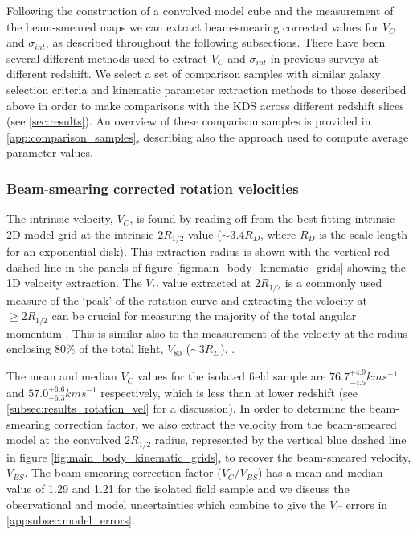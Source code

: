 \documentclass[fleqn,usenatbib]{mn2e}
\begin{document}
Following the construction of a convolved model cube and the measurement of the beam-smeared maps we can extract beam-smearing corrected values for $V_{C}$ and $\sigma_{int}$, as described throughout the following subsections.
There have been several different methods used to extract $V_{C}$ and $\sigma_{int}$ in previous surveys at different redshift.
We select a set of comparison samples with similar galaxy selection criteria and kinematic parameter extraction methods to those described above in order to make comparisons with the KDS across different redshift slices (see \cref{sec:results}).
An overview of these comparison samples is provided in \cref{app:comparison_samples}, describing also the approach used to compute average parameter values.

\subsubsection{Beam-smearing corrected rotation velocities}\label{subsubsec:beam_smearing_corrected_velocities}
The intrinsic velocity, $V_{C}$, is found by reading off from the best fitting intrinsic 2D model grid at the intrinsic $2R_{1/2}$ value ($\sim3.4R_{D}$, where $R_{D}$ is the scale length for an exponential disk).
This extraction radius is shown with the vertical red dashed line in the panels of figure \ref{fig:main_body_kinematic_grids} showing the 1D velocity extraction.
The $V_{C}$ value extracted at $2R_{1/2}$ is a commonly used measure of the `peak' of the rotation curve \citep[e.g.][]{Miller2011,Pelliccia2016,Stott2016,Harrison2017} and extracting the velocity at $\geqslant 2R_{1/2}$ can be crucial for measuring the majority of the total angular momentum \citep[e.g.][]{Obreschkow2015,Harrison2017,Swinbank2017}.
This is similar also to the measurement of the velocity at the radius enclosing 80$\%$ of the total light, $V_{80}$ ($\sim3R_{D}$), \citep{Tiley2016a}.

The mean and median $V_{C}$ values for the isolated field sample are $76.7^{+4.9}_{-4.5}kms^{-1}$ and $57.0^{+6.6}_{-6.3}kms^{-1}$ respectively, which is less than at lower redshift (see \cref{subsec:results_rotation_vel} for a discussion).
In order to determine the beam-smearing correction factor, we also extract the velocity from the beam-smeared model at the convolved $2R_{1/2}$ radius, represented by the vertical blue dashed line in figure \ref{fig:main_body_kinematic_grids}, to recover the beam-smeared velocity, $V_{BS}$.
The beam-smearing correction factor ($V_{C}/V_{BS}$) has a mean and median value of 1.29 and 1.21 for the isolated field sample and we discuss the observational and model uncertainties which combine to give the $V_{C}$ errors in \cref{appsubsec:model_errors}. \\
\end{document}
